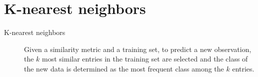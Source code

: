 \section{K-nearest neighbors}

\begin{description}
    \item[K-nearest neighbors] 
        Given a similarity metric and a training set,
        to predict a new observation, the $k$ most similar entries in the training set are selected
        and the class of the new data is determined as the most frequent class among the $k$ entries.
\end{description}
